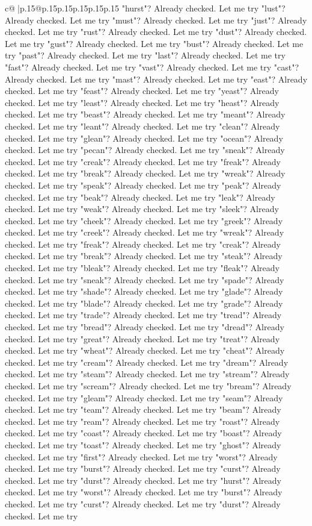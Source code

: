 \documentclass{article}
\begin{document}
{\begin{supertabular}{c@{$\;$}|p{.15\linewidth}@{}p{.15\linewidth}p{.15\linewidth}p{.15\linewidth}p{.15\linewidth}p{.15\linewidth}}
{{{"hurst"? Already checked. Let me try "lust"? Already checked. Let me try "must"? Already checked. Let me try "just"? Already checked. Let me try "rust"? Already checked. Let me try "dust"? Already checked. Let me try "gust"? Already checked. Let me try "bust"? Already checked. Let me try "past"? Already checked. Let me try "last"? Already checked. Let me try "fast"? Already checked. Let me try "vast"? Already checked. Let me try "cast"? Already checked. Let me try "mast"? Already checked. Let me try "east"? Already checked. Let me try "feast"? Already checked. Let me try "yeast"? Already checked. Let me try "least"? Already checked. Let me try "heast"? Already checked. Let me try "beast"? Already checked. Let me try "meant"? Already checked. Let me try "leant"? Already checked. Let me try "clean"? Already checked. Let me try "glean"? Already checked. Let me try "ocean"? Already checked. Let me try "pecan"? Already checked. Let me try "sneak"? Already checked. Let me try "creak"? Already checked. Let me try "freak"? Already checked. Let me try "break"? Already checked. Let me try "wreak"? Already checked. Let me try "speak"? Already checked. Let me try "peak"? Already checked. Let me try "beak"? Already checked. Let me try "leak"? Already checked. Let me try "weak"? Already checked. Let me try "sleek"? Already checked. Let me try "cheek"? Already checked. Let me try "greek"? Already checked. Let me try "creek"? Already checked. Let me try "wreak"? Already checked. Let me try "freak"? Already checked. Let me try "creak"? Already checked. Let me try "break"? Already checked. Let me try "steak"? Already checked. Let me try "bleak"? Already checked. Let me try "fleak"? Already checked. Let me try "sneak"? Already checked. Let me try "spade"? Already checked. Let me try "shade"? Already checked. Let me try "glade"? Already checked. Let me try "blade"? Already checked. Let me try "grade"? Already checked. Let me try "trade"? Already checked. Let me try "tread"? Already checked. Let me try "bread"? Already checked. Let me try "dread"? Already checked. Let me try "great"? Already checked. Let me try "treat"? Already checked. Let me try "wheat"? Already checked. Let me try "cheat"? Already checked. Let me try "cream"? Already checked. Let me try "dream"? Already checked. Let me try "steam"? Already checked. Let me try "stream"? Already checked. Let me try "scream"? Already checked. Let me try "bream"? Already checked. Let me try "gleam"? Already checked. Let me try "seam"? Already checked. Let me try "team"? Already checked. Let me try "beam"? Already checked. Let me try "ream"? Already checked. Let me try "roast"? Already checked. Let me try "coast"? Already checked. Let me try "boast"? Already checked. Let me try "toast"? Already checked. Let me try "ghost"? Already checked. Let me try "first"? Already checked. Let me try "worst"? Already checked. Let me try "burst"? Already checked. Let me try "curst"? Already checked. Let me try "durst"? Already checked. Let me try "hurst"? Already checked. Let me try "worst"? Already checked. Let me try "burst"? Already checked. Let me try "curst"? Already checked. Let me try "durst"? Already checked. Let me try }}}
\end{supertabular}}
\end{document}
